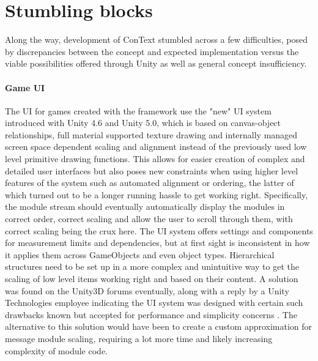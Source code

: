 \section{Stumbling blocks}
Along the way, development of ConText stumbled across a few difficulties, posed by discrepancies between the concept and expected implementation versus the viable possibilities offered through Unity as well as general concept insufficiency. 
\paragraph{Game UI} The UI for games created with the framework use the "new" UI system introduced with Unity 4.6 and Unity 5.0, which is based on canvas-object relationships, full material supported texture drawing and internally managed screen space dependent scaling and alignment instead of the previously used low level primitive drawing functions. This allows for easier creation of complex and detailed user interfaces but also poses new constraints when using higher level features of the system such as automated alignment or ordering, the latter of which turned out to be a longer running hassle to get working right. Specifically, the module stream should eventually automatically display the modules in correct order, correct scaling and allow the user to scroll through them, with correct scaling being the crux here. The UI system offers settings and components for measurement limits and dependencies, but at first sight is inconsistent in how it applies them across GameObjects and even object types. Hierarchical structures need to be set up in a more complex and unintuitive way to get the scaling of low level items working right and based on their content. A solution was found on the Unity3D forums eventually, along with a reply by a Unity Technologies employee indicating the UI system was designed with certain such drawbacks known but accepted for performance and simplicity concerns \cite{U3DC1}. The alternative to this solution would have been to create a custom approximation for message module scaling, requiring a lot more time and likely increasing complexity of module code.

